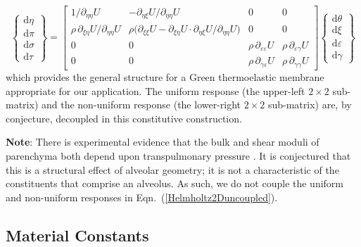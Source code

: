\begin{equation}
\left\{ \begin{matrix}
\mathrm{d} \eta \\ \mathrm{d} \pi \\
\mathrm{d} \sigma \\ \mathrm{d} \tau
\end{matrix} \right\} = \begin{bmatrix}
1 / \partial_{\eta\eta} U & 
-\partial_{\eta\xi} U / \partial_{\eta\eta} U & 
0 & 0 \\ 
\rho \, \partial_{\xi\eta} U / \partial_{\eta\eta} U & 
\rho \bigl( \partial_{\xi\xi} U - \partial_{\xi\eta} U \!\cdot\! \partial_{\eta\xi} U / \partial_{\eta\eta} U \bigr) & 0 & 0 \\
0 & 0 & \rho \, \partial_{\varepsilon\varepsilon} U & 
\rho \, \partial_{\varepsilon\gamma} U \\
0 & 0 & \rho \, \partial_{\gamma\varepsilon} U & 
\rho \, \partial_{\gamma\gamma} U 
\end{bmatrix} 
\left\{ \begin{matrix}
\mathrm{d}\theta \\ \mathrm{d} \xi \\
\mathrm{d} \varepsilon \\ \mathrm{d} \gamma
\end{matrix} \right\}  
\label{Helmholtz2Duncoupled}
\end{equation}
which provides the general structure for a Green thermo\-elastic membrane appropriate for our application.  The uniform response (the upper-left $2 \times 2$ sub-matrix) and the non-uniform response (the lower-right $2 \times 2$ sub-matrix) are, by conjecture, decoupled in this constitutive construction.

\medskip\noindent
\textbf{Note}: There is experimental evidence that the bulk and shear moduli of parenchyma both depend upon transpulmonary pressure \cite{LaiFook79,Jahedetal90}.  It is conjectured that this is a structural effect of alveolar geometry; it is not a characteristic of the constituents that comprise an alveolus.  As such, we do not couple the uniform and non-uniform responses in Eqn.~(\ref{Helmholtz2Duncoupled}).

\subsection{Material Constants}
\label{secMaterialConstants}

